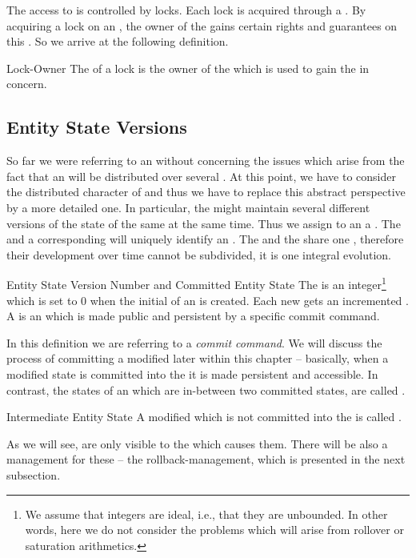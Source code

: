 \documentclass[a4paper, 12pt]{book}
\begin{document}
The access to  is controlled by locks. Each lock is
acquired through a . By acquiring a lock on an
, the owner of the  gains certain rights
and guarantees on this . So we arrive at the following
definition.
\begin{definition*}{Lock-Owner}
  The  of a lock is the owner of the 
  which is used to gain the  in concern.
\end{definition*}


\subsection{Entity State Versions}

So far we were referring to an  without concerning the
issues which arise from the fact that an  will be
distributed over several . At this point,
we have to consider the distributed character of  and
thus we have to replace this abstract perspective by a more detailed
one.
%
In particular, the \SYNEIGHT might maintain several different versions
of the state of the same  at the same time. Thus we assign to an
 a . The  and a
corresponding  will uniquely identify an . The  and the  share
one , therefore their development over time cannot be
subdivided, it is one integral evolution. 
\begin{definition*}{Entity State Version Number and Committed Entity State}
  The  is an integer\footnote{We assume that
    integers are ideal, i.e., that they are unbounded. In other words, here we
    do not consider the problems which will arise from rollover or saturation
    arithmetics.}  which is set to 0 when the initial  of an
   is created.
  Each new  gets an incremented .
  A  is an  which is made public
  and persistent by a specific commit command. 
\end{definition*}
%
In this definition we are referring to a \emph{commit command}. We will
discuss the process of committing a modified  later within
this chapter -- basically, when a modified state is committed into the
 it is made persistent and accessible. In contrast, the
states of an  which are in-between two committed states, are called
.
%
\begin{definition*}{Intermediate Entity State}
  A modified  which is not committed into the 
  is called .
\end{definition*}
%
As we will see,  are only visible to the
 which causes them. There will be also a management for these
 -- the rollback-management, which is presented
in the next subsection.
\end{document}
